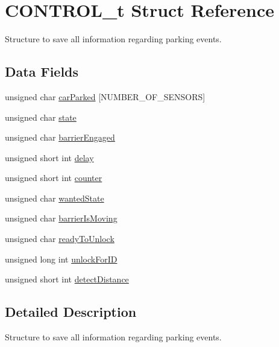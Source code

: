 \hypertarget{struct_c_o_n_t_r_o_l__t}{}\section{C\+O\+N\+T\+R\+O\+L\+\_\+t Struct Reference}
\label{struct_c_o_n_t_r_o_l__t}


Structure to save all information regarding parking events.  


\subsection*{Data Fields}
\begin{DoxyCompactItemize}
\item 
unsigned char \hyperlink{struct_c_o_n_t_r_o_l__t_abe8b8c6a40ddd15be8972fa85474f58b}{car\+Parked} \mbox{[}N\+U\+M\+B\+E\+R\+\_\+\+O\+F\+\_\+\+S\+E\+N\+S\+O\+RS\mbox{]}
\item 
unsigned char \hyperlink{struct_c_o_n_t_r_o_l__t_ab12828525693568ae9c217805bea1ef9}{state}
\item 
unsigned char \hyperlink{struct_c_o_n_t_r_o_l__t_a0b696a7bbf04038baa95fad73cb13e42}{barrier\+Engaged}
\item 
unsigned short int \hyperlink{struct_c_o_n_t_r_o_l__t_aa24a24930cf2d359abdb887ad090dc1a}{delay}
\item 
unsigned short int \hyperlink{struct_c_o_n_t_r_o_l__t_a99cb743fd6ed4db98a5220c2a27c4341}{counter}
\item 
unsigned char \hyperlink{struct_c_o_n_t_r_o_l__t_aeb475cff437db460df4f0a7fda472aac}{wanted\+State}
\item 
unsigned char \hyperlink{struct_c_o_n_t_r_o_l__t_a92465825e621fe2c54b86f0a350ea163}{barrier\+Is\+Moving}
\item 
unsigned char \hyperlink{struct_c_o_n_t_r_o_l__t_adca9fd17f330eff575ac6c4bca9aac98}{ready\+To\+Unlock}
\item 
unsigned long int \hyperlink{struct_c_o_n_t_r_o_l__t_a56fc156d2b30953b714e34a76a049912}{unlock\+For\+ID}
\item 
unsigned short int \hyperlink{struct_c_o_n_t_r_o_l__t_a8132ad4bfa188798ef3a47d971342fec}{detect\+Distance}
\end{DoxyCompactItemize}


\subsection{Detailed Description}
Structure to save all information regarding parking events. 


